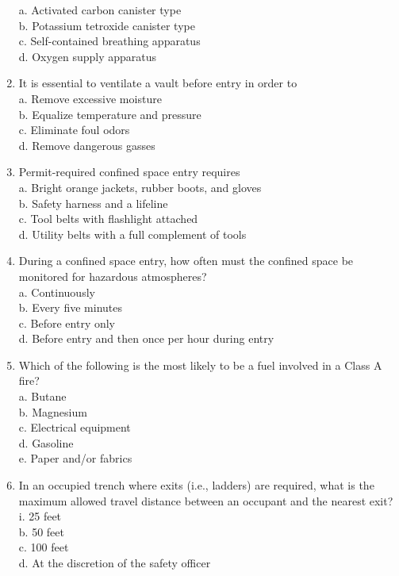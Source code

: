 \begin{enumerate}[1.]
a. Activated carbon canister type\\
b. Potassium tetroxide canister type\\
c. Self-contained breathing apparatus\\
d. Oxygen supply apparatus\\
\item It is essential to ventilate a vault before entry in order to\\
a. Remove excessive moisture\\
b. Equalize temperature and pressure\\
c. Eliminate foul odors\\
d. Remove dangerous gasses\\
\item Permit-required confined space entry requires\\
a. Bright orange jackets, rubber boots, and gloves\\
b. Safety harness and a lifeline\\
c. Tool belts with flashlight attached\\
d. Utility belts with a full complement of tools\\
\item During a confined space entry, how often must the confined space be monitored for hazardous atmospheres?\\
a. Continuously\\
b. Every five minutes\\
c. Before entry only\\
d. Before entry and then once per hour during entry\\
\item Which of the following is the most likely to be a fuel involved in a Class A fire?\\
a. Butane\\
b. Magnesium\\
c. Electrical equipment\\
d. Gasoline\\
e. Paper and/or fabrics\\
\item In an occupied trench where exits (i.e., ladders) are required, what is the maximum allowed travel distance between an occupant and the nearest exit?\\
i. 25 feet\\
b. 50 feet\\
c. 100 feet\\
d. At the discretion of the safety officer\\

\end{enumerate}
